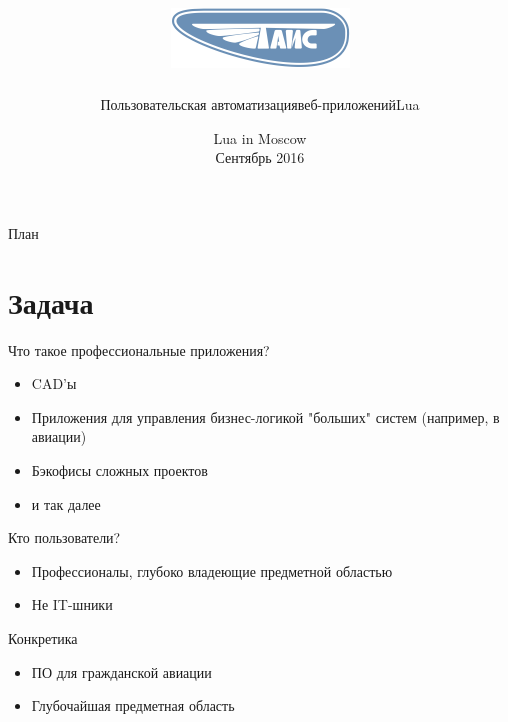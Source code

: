\documentclass[handout]{beamer}
\title{\includegraphics[height=.15\textheight]{logo}}
\author{Пользовательская автоматизация\newlineпрофессиональных веб-приложений\newlineна Lua}
\institute{Александр Гладыш\newline@agladysh}
\date{Lua in Moscow\\Сентябрь 2016}
\begin{document}
\maketitle


\begin{frame}{План}

\tableofcontents

\end{frame}


\section{Задача}


\begin{frame}{Что такое профессиональные приложения?}

\begin{itemize}
\item CAD'ы
\item Приложения для управления бизнес-логикой "больших" систем
      (например, в авиации)
\item Бэкофисы сложных проектов
\item и так далее
\end{itemize}

\end{frame}


\begin{frame}{Кто пользователи?}

\begin{itemize}
\item Профессионалы, глубоко владеющие предметной областью
\item Не IT-шники
\end{itemize}

\end{frame}


\begin{frame}{Конкретика}

\begin{itemize}
\item ПО для гражданской авиации
\item Глубочайшая предметная область
\end{itemize}

\end{frame}
\end{document}
